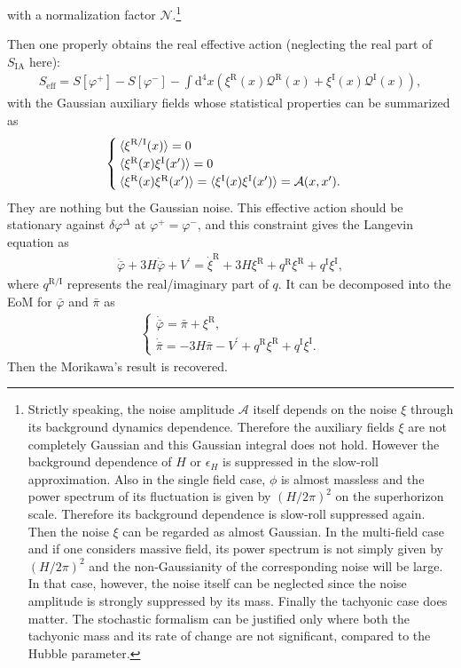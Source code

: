 \documentclass[aps, prd
, preprint
, nofootinbib 
]{revtex4-1}
\newcommand{\dd}{\mathrm{d}}
\newcommand{\bae}[1]{\begin{align} #1 \end{align}}
\newcommand{\bce}[1]{\begin{cases} #1 \end{cases}}
\begin{document}
with a normalization factor $\mathcal{N}$.\footnote{Strictly speaking, the noise amplitude $\mathcal{A}$ itself depends on the noise $\xi$
through its background dynamics dependence. Therefore the auxiliary fields $\xi$ are not completely Gaussian and this Gaussian integral
does not hold.
However the background dependence of $H$ or $\epsilon_H$ is suppressed in the slow-roll approximation.
Also in the single field case, $\phi$ is almost massless and the power spectrum of its fluctuation is given by $(H/2\pi)^2$ on the superhorizon scale.
Therefore its background dependence is slow-roll suppressed again. Then the noise $\xi$ can be regarded as almost Gaussian.
In the multi-field case and if one considers massive field, its power spectrum is not simply given by $(H/2\pi)^2$
and the non-Gaussianity of the corresponding noise will be large. In that case, however, the noise itself can be neglected since the noise amplitude
is strongly suppressed by its mass. Finally the tachyonic case does matter. The stochastic formalism can be justified only where both the 
tachyonic mass and its rate of change are not significant, compared to the Hubble parameter.}\vfill

Then one properly obtains the real effective action (neglecting the real part of $S_\text{IA}$ here):
\bae{
	S_\text{eff}=S[\varphi^+]-S[\varphi^-]-\int\dd^4x(\xi^\text{R}(x)\mathcal{Q}^\text{R}(x)+\xi^\text{I}(x)\mathcal{Q}^\text{I}(x)),
}
with the Gaussian auxiliary fields whose statistical properties can be summarized as
\bae{
	\bce{
		\displaystyle
		\braket{\xi^{\text{R}/\text{I}}(x)}=0 \\
		\braket{\xi^{\text{R}}(x)\xi^\text{I}(x^\prime)}=0 \\
		\braket{\xi^\text{R}(x)\xi^\text{R}(x^\prime)}=\braket{\xi^\text{I}(x)\xi^\text{I}(x^\prime)}=\mathcal{A}(x,x^\prime).
	}
}
They are nothing but the Gaussian noise. 
This effective action should be stationary against $\delta\varphi^\Delta$ at $\varphi^+=\varphi^-$, and this constraint gives
the Langevin equation as
\bae{
	\ddot{\bar{\varphi}}+3H\dot{\bar{\varphi}}+V^\prime=\dot\xi^\text{R}+3H\xi^\text{R}+q^\text{R}\xi^\text{R}+q^\text{I}\xi^\text{I},
}
where $q^{\text{R}/\text{I}}$ represents the real/imaginary part of $q$.
It can be decomposed into the EoM for $\bar{\varphi}$ and $\bar{\pi}$ as
\bae{
	\bce{
		\displaystyle
		\dot{\bar{\varphi}}=\bar{\pi}+\xi^\text{R}, \\
		\displaystyle
		\dot{\bar{\pi}}=-3H\bar{\pi}-V^\prime+q^\text{R}\xi^\text{R}+q^\text{I}\xi^\text{I}.
	}
}
Then the Morikawa's result is recovered.
\end{document}
